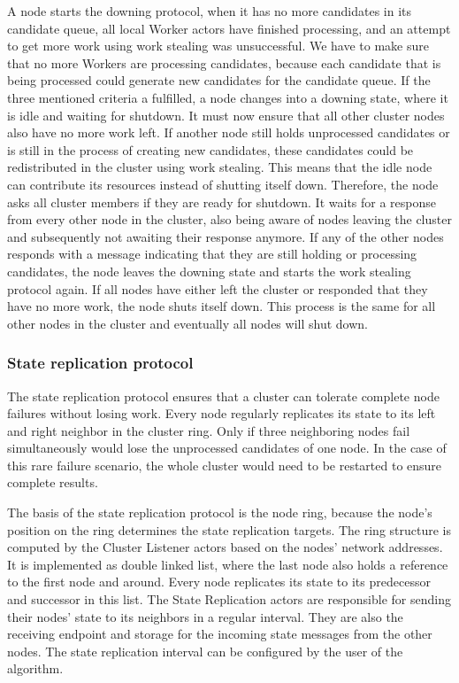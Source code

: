   A node starts the downing protocol, when it has no more candidates in its candidate queue, all local Worker actors have finished processing, and an attempt to get more work using work stealing was unsuccessful.
  We have to make sure that no more Workers are processing candidates, because each candidate that is being processed could generate new candidates for the candidate queue.
  If the three mentioned criteria a fulfilled, a \dodo{} node changes into a downing state, where it is idle and waiting for shutdown.
  It must now ensure that all other cluster nodes also have no more work left.
  If another node still holds unprocessed candidates or is still in the process of creating new candidates, these candidates could be redistributed in the cluster using work stealing.
  This means that the idle node can contribute its resources instead of shutting itself down.
  Therefore, the node asks all cluster members if they are ready for shutdown.
  It waits for a response from every other node in the cluster, also being aware of nodes leaving the cluster and subsequently not awaiting their response anymore.
  If any of the other nodes responds with a message indicating that they are still holding or processing candidates, the node leaves the downing state and starts the work stealing protocol again.
  If all nodes have either left the cluster or responded that they have no more work, the node shuts itself down.
  This process is the same for all other nodes in the cluster and eventually all nodes will shut down.

\subsubsection{State replication protocol}\label{protocol:stateReplication}

  The state replication protocol ensures that a \dodo{} cluster can tolerate complete node failures without losing work.
  Every node regularly replicates its state to its left and right neighbor in the cluster ring.
  Only if three neighboring nodes fail simultaneously would \dodo{} lose the unprocessed candidates of one node.
  In the case of this rare failure scenario, the whole \dodo{} cluster would need to be restarted to ensure complete results.

  The basis of the state replication protocol is the node ring, because the node's position on the ring determines the state replication targets.
  The ring structure is computed by the Cluster Listener actors based on the nodes' network addresses.
  It is implemented as double linked list, where the last node also holds a reference to the first node and around.
  Every node replicates its state to its predecessor and successor in this list.
  The State Replication actors are responsible for sending their nodes' state to its neighbors in a regular interval.
  They are also the receiving endpoint and storage for the incoming state messages from the other nodes.
  The state replication interval can be configured by the user of the \dodo{} algorithm.

